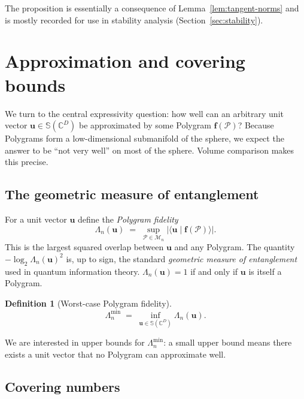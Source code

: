 \documentclass[11pt,letterpaper]{article}
\theoremstyle{definition}
\newtheorem{definition}[theorem]{Definition}
\newcommand{\C}{\mathbb{C}}
\newcommand{\Sphere}{\mathbb{S}}
\newcommand{\Polygram}{\mathcal{P}}
\newcommand{\Mset}{\mathcal{M}}
\newcommand{\inner}[2]{\langle #1 \mid #2 \rangle}
\newcommand{\abs}[1]{\lvert #1 \rvert}
\begin{document}
The proposition is essentially a consequence of Lemma~\ref{lem:tangent-norms}
and is mostly recorded for use in stability analysis (Section~\ref{sec:stability}).

\section{Approximation and covering bounds}
\label{sec:approximation}

We turn to the central expressivity question: how well can an arbitrary unit
vector $\bm{u} \in \Sphere(\C^{D})$ be approximated by some Polygram
$\bm{f}(\Polygram)$? Because Polygrams form a low-dimensional submanifold of
the sphere, we expect the answer to be ``not very well'' on most of the
sphere. Volume comparison makes this precise.

\subsection{The geometric measure of entanglement}

For a unit vector $\bm{u}$ define the \emph{Polygram fidelity}
\[
\Lambda_{n}(\bm{u}) \;=\; \sup_{\Polygram \in \Mset_{n}}
    \abs{\inner{\bm{u}}{\bm{f}(\Polygram)}}.
\]
This is the largest squared overlap between $\bm{u}$ and any Polygram. The
quantity $-\log_{2} \Lambda_{n}(\bm{u})^{2}$ is, up to sign, the standard
\emph{geometric measure of entanglement} used in quantum information theory.
$\Lambda_{n}(\bm{u}) = 1$ if and only if $\bm{u}$ is itself a Polygram.

\begin{definition}[Worst-case Polygram fidelity]
\[
\Lambda^{\min}_{n} \;=\; \inf_{\bm{u} \in \Sphere(\C^{D})} \Lambda_{n}(\bm{u}).
\]
\end{definition}

We are interested in upper bounds for $\Lambda^{\min}_{n}$: a small upper bound
means there exists a unit vector that no Polygram can approximate well.

\subsection{Covering numbers}
\end{document}
